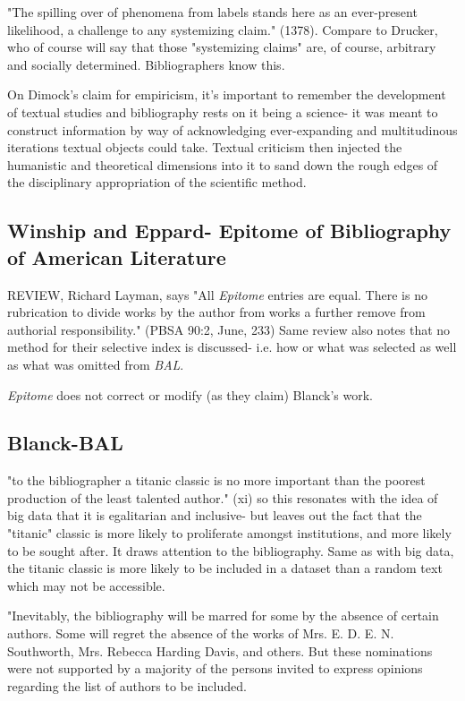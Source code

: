 \documentclass[course, english]{Notes}
\newcommand{\n}{\scalebox{2}{\textbf{\framebox{$\aleph$} } } }
\begin{document}
{\begin{outline}
\1 "The spilling over of phenomena from labels stands here as an ever-present likelihood, a challenge to any systemizing claim." (1378). 
	\2 Compare to Drucker, who of course will say that those "systemizing claims" are, of course, arbitrary and socially determined. 
		\3 Bibliographers know this. 

\1 \n On Dimock's claim for empiricism, it's important to remember the development of textual studies and bibliography rests on it being a science- it was meant to construct information by way of acknowledging ever-expanding and multitudinous iterations textual objects could take. Textual criticism then injected the humanistic and theoretical dimensions into it to sand down the rough edges of the disciplinary appropriation of the scientific method. 

\subsection{Winship and Eppard- Epitome of Bibliography of American Literature}
	\1 REVIEW, Richard Layman, says "All \textit{Epitome} entries are equal. There is no rubrication to divide works by the author from works a further remove from authorial responsibility." (PBSA 90:2, June, 233)
		\2 Same review also notes that no method for their selective index is discussed- i.e. how or what was selected as well as what was omitted from \textit{BAL}.
		
	\1 \textit{Epitome} does not correct or modify (as they claim) Blanck's work. 

\end{outline}

\subsection{Blanck-BAL}
\begin{outline}
\1 "to the bibliographer a titanic classic is no more important than the poorest production of the least talented author." (xi)
	\2 \n so this resonates with the idea of big data that it is egalitarian and inclusive- but leaves out the fact that the "titanic" classic is more likely to proliferate amongst institutions, and more likely to be sought after. It draws attention to the bibliography. Same as with big data, the titanic classic is more likely to be included in a dataset than a random text which may not be accessible.
	
\1 "Inevitably, the bibliography will be marred for some by the absence of certain authors. Some will regret the absence of the works of Mrs. E. D. E. N. Southworth, Mrs. Rebecca Harding Davis, and others. But these nominations were not supported by a majority of the persons invited to express opinions regarding the list of authors to be included.


\end{outline}}
\end{document}
